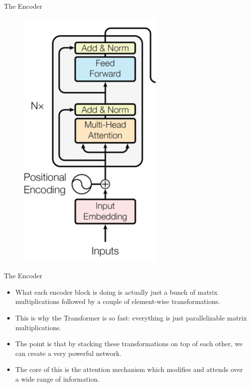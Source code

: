 \documentclass[handout]{beamer}
\begin{document}
\begin{frame}{The Encoder}

     \begin{figure}[h]
        	\includegraphics[scale = 0.39]{pics/transformerencoder.png}
        \end{figure}  


\end{frame}

\begin{frame}{The Encoder}
\begin{scriptsize}
\begin{itemize}

 \item  What each encoder block is doing is actually just a bunch of matrix multiplications followed by a couple of element-wise transformations.
 
 \item This is why the Transformer is so fast: everything is just parallelizable matrix multiplications.
 
 \item The point is that by stacking these transformations on top of each other, we can create a very powerful network. 
 
 \item The core of this is the attention mechanism which modifies and attends over a wide range of information.
 
\end{itemize}

\end{scriptsize}

\end{frame}
\end{document}
